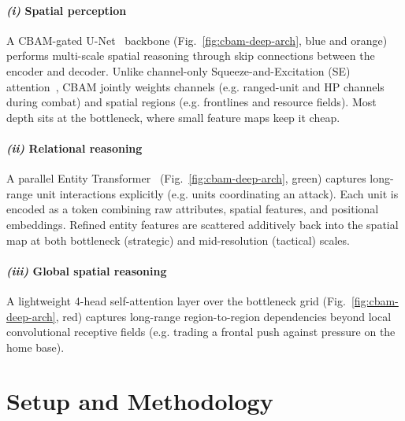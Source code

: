 \documentclass[conference]{IEEEtran}
\begin{document}
\paragraph*{\textbf{\emph{(i)} Spatial perception}}
A CBAM-gated U-Net~\cite{ronnebergerUNetConvolutionalNetworks2015,wooCBAMConvolutionalBlock2018} backbone (Fig.~\ref{fig:cbam-deep-arch}, blue and orange) performs multi-scale spatial reasoning through skip connections between the encoder and decoder. Unlike channel-only Squeeze-and-Excitation (SE) attention~\cite{huSqueezeandExcitationNetworks2018}, CBAM jointly weights channels (e.g. ranged-unit and HP channels during combat) and spatial regions (e.g. frontlines and resource fields). Most depth sits at the bottleneck, where small feature maps keep it cheap.

\paragraph*{\textbf{\emph{(ii)} Relational reasoning}}
A parallel Entity Transformer~\cite{vaswaniAttentionAllYou2017} (Fig.~\ref{fig:cbam-deep-arch}, green) captures long-range unit interactions explicitly (e.g. units coordinating an attack). Each unit is encoded as a token combining raw attributes, spatial features, and positional embeddings. Refined entity features are scattered additively back into the spatial map at both bottleneck (strategic) and mid-resolution (tactical) scales.

\paragraph*{\textbf{\emph{(iii)} Global spatial reasoning}}
A lightweight 4-head self-attention layer over the bottleneck grid (Fig.~\ref{fig:cbam-deep-arch}, red) captures long-range region-to-region dependencies beyond local convolutional receptive fields (e.g. trading a frontal push against pressure on the home base).

\section{Setup and Methodology}
\label{sec:setup-method}
\end{document}
